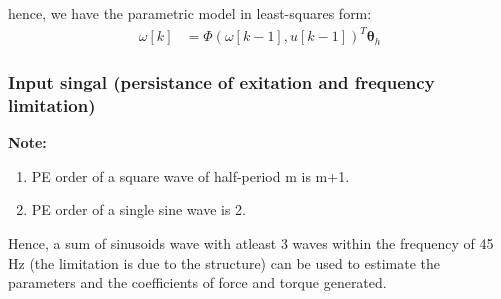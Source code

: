 hence, we have the parametric model in least-squares form:
\begin{align*}
    \omega[k] &= \Phi(\omega[k-1], u[k-1])^T \pmb \theta_h
\end{align*}

\subsubsection{Input singal (persistance of exitation and frequency limitation)}
\textbf{Note:}
\begin{enumerate}
    \item PE order of a square wave of half-period m is m+1.
    \item PE order of a single sine wave is 2.
\end{enumerate}
Hence, a sum of sinusoids wave with atleast 3 waves within the frequency of 45 Hz (the limitation is due to the structure) can be used to estimate the parameters and the coefficients of force and torque generated.
